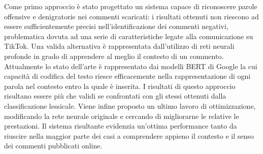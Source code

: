 Come primo approccio è stato progettato un sistema capace di riconoscere parole offensive e denigratorie nei commenti scaricati: i risultati ottenuti non riescono ad essere sufficientemente precisi nell'identificazione dei commenti negativi, problematica dovuta ad una serie di caratteristiche legate alla comunicazione su TikTok. 
Una valida alternativa è rappresentata dall'utilizzo di reti neurali profonde in grado di apprendere al meglio il contesto di un commento. Attualmente lo stato dell'arte è rappresentato dai modelli BERT di Google la cui capacità di codifica del testo riesce efficacemente nella rappresentazione di ogni parola nel contesto entro la quale è inserita. I risultati di questo approccio risultano essere più che validi se confrontati con gli stessi ottenuti dalla classificazione lessicale. 
Viene infine proposto un ultimo lavoro di ottimizzazione, modificando la rete neurale originale e cercando di migliorarne le relative le prestazioni. Il sistema risultante evidenzia un'ottima performance tanto da riuscire nella maggior parte dei casi a comprendere appieno il contesto e il senso dei commenti pubblicati online.
